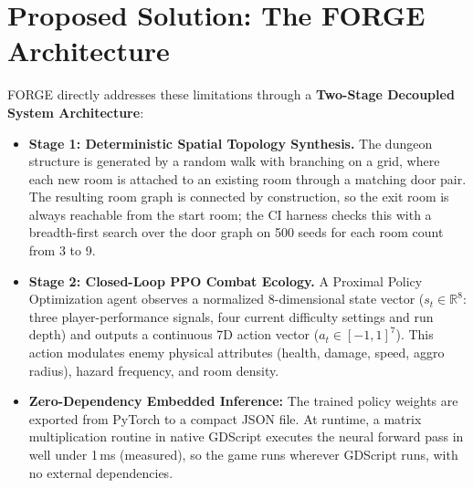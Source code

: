 \section{Proposed Solution: The FORGE Architecture}\label{sec:proposed}
FORGE directly addresses these limitations through a \textbf{Two-Stage Decoupled System Architecture}:
\begin{itemize}
    \item \textbf{Stage 1: Deterministic Spatial Topology Synthesis.} The dungeon structure is generated by a random walk with branching on a grid, where each new room is attached to an existing room through a matching door pair. The resulting room graph is connected by construction, so the exit room is always reachable from the start room; the CI harness checks this with a breadth-first search over the door graph on 500 seeds for each room count from 3 to 9.
    \item \textbf{Stage 2: Closed-Loop PPO Combat Ecology.} A Proximal Policy Optimization agent observes a normalized 8-dimensional state vector ($s_t \in \mathbb{R}^8$: three player-performance signals, four current difficulty settings and run depth) and outputs a continuous 7D action vector ($a_t \in [-1, 1]^7$). This action modulates enemy physical attributes (health, damage, speed, aggro radius), hazard frequency, and room density.
    \item \textbf{Zero-Dependency Embedded Inference:} The trained policy weights are exported from PyTorch to a compact JSON file. At runtime, a matrix multiplication routine in native GDScript executes the neural forward pass in well under 1\,ms (measured), so the game runs wherever GDScript runs, with no external dependencies.
\end{itemize}

